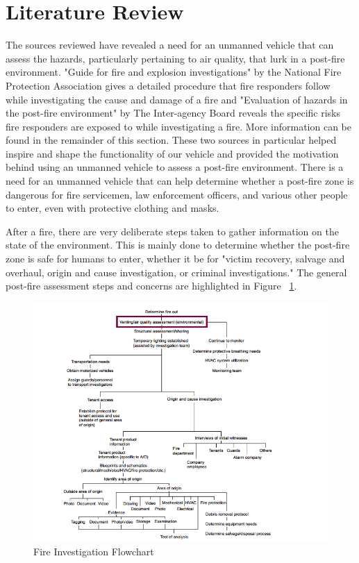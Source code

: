 \section{Literature Review}
The sources reviewed have revealed a need for an unmanned vehicle that can assess the hazards, particularly pertaining to air quality, that lurk in a post-fire environment. "Guide for fire and explosion investigations" by the National Fire Protection Association gives a detailed procedure that fire responders follow while investigating the cause and damage of a fire\cite{nfpa} and "Evaluation of hazards in the post-fire environment" by The Inter-agency Board reveals the specific risks fire responders are exposed to while investigating a fire\cite{evaluationofhazards}. More information can be found in the remainder of this section. These two sources in particular helped inspire and shape the functionality of our vehicle and provided the motivation behind using an unmanned vehicle to assess a post-fire environment. There is a need for an unmanned vehicle that can help determine whether a post-fire zone is dangerous for fire servicemen, law enforcement officers, and various other people to enter, even with protective clothing and masks.\cite{evaluationofhazards} 

After a fire, there are very deliberate steps taken to gather information on the state of the environment. This is mainly done to determine whether the post-fire zone is safe for humans to enter, whether it be for "victim recovery, salvage and overhaul, origin and cause investigation, or criminal investigations." \cite{evaluationofhazards} The general post-fire assessment steps and concerns are highlighted in Figure ~\ref{fig:FireInvesFlowChart}.



\begin{figure}[H]
\centering
\includegraphics[scale=0.75]{flowchart.png}
\caption{Fire Investigation Flowchart  \cite{nfpa}}
\label{fig:FireInvesFlowChart}
\end{figure}

